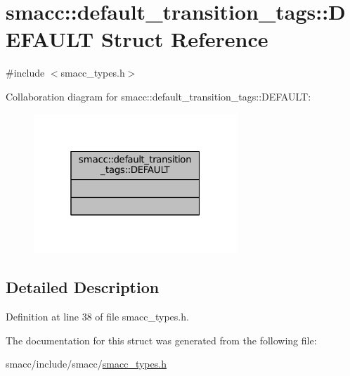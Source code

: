 \hypertarget{structsmacc_1_1default__transition__tags_1_1DEFAULT}{}\section{smacc\+:\+:default\+\_\+transition\+\_\+tags\+:\+:D\+E\+F\+A\+U\+LT Struct Reference}
\label{structsmacc_1_1default__transition__tags_1_1DEFAULT}


{\ttfamily \#include $<$smacc\+\_\+types.\+h$>$}



Collaboration diagram for smacc\+:\+:default\+\_\+transition\+\_\+tags\+:\+:D\+E\+F\+A\+U\+LT\+:
\nopagebreak
\begin{figure}[H]
\begin{center}
\leavevmode
\includegraphics[width=217pt]{structsmacc_1_1default__transition__tags_1_1DEFAULT__coll__graph}
\end{center}
\end{figure}


\subsection{Detailed Description}


Definition at line 38 of file smacc\+\_\+types.\+h.



The documentation for this struct was generated from the following file\+:\begin{DoxyCompactItemize}
\item 
smacc/include/smacc/\hyperlink{smacc__types_8h}{smacc\+\_\+types.\+h}\end{DoxyCompactItemize}
